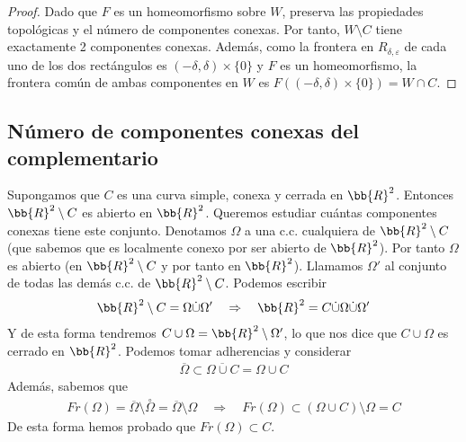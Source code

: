 \begin{lema}
\begin{proof}
        Dado que $F$ es un homeomorfismo sobre $W$, preserva las propiedades topológicas y el número de componentes conexas. Por tanto, $W \setminus C$ tiene exactamente 2 componentes conexas. Además, como la frontera en $R_{\delta,\varepsilon}$ de cada uno de los dos rectángulos es $(-\delta, \delta) \times \{0\}$ y $F$ es un homeomorfismo, la frontera común de ambas componentes en $W$ es $F((-\delta, \delta) \times \{0\}) = W\cap C$.
    \end{proof}
\end{lema}

\subsection{Número de componentes conexas del complementario}

\begin{observacion}
    Supongamos que $C$ es una curva simple, conexa y cerrada en $\bb{R}^2$. Entonces $\bb{R}^2 \setminus C$ es abierto en $\bb{R}^2$. Queremos estudiar cuántas componentes conexas tiene este conjunto. Denotamos $\Omega$ a una c.c. cualquiera de $\bb{R}^2 \setminus C$ (que sabemos que es localmente conexo por ser abierto de $\bb{R}^2$). Por tanto $\Omega$ es abierto (en $\bb{R}^2\setminus C$ y por tanto en $\bb{R}^2$). Llamamos $\Omega'$ al conjunto de todas las demás c.c. de $\bb{R}^2 \setminus C$. Podemos escribir
    \begin{gather*}
        \bb{R}^2 \setminus C = \Omega \dot{\cup} \Omega' \quad \Rightarrow \quad \bb{R}^2 = C \dot{\cup} \Omega \dot{\cup} \Omega'
    \end{gather*}
    Y de esta forma tendremos $C\cup \Omega = \bb{R}^2 \setminus \Omega'$, lo que nos dice que $C\cup \Omega$ es cerrado en $\bb{R}^2$. Podemos tomar adherencias y considerar
    \begin{gather*}
        \overline{\Omega} \subset \overline{\Omega \cup C} = \Omega \cup C 
    \end{gather*}
    Además, sabemos que 
    \begin{gather*}
        Fr(\Omega) = \overline{\Omega} \setminus \overset{\circ}{\Omega} = \overline{\Omega} \setminus \Omega \quad \Rightarrow \quad Fr(\Omega) \subset (\Omega \cup C)\setminus \Omega = C
    \end{gather*}
    De esta forma hemos probado que $Fr(\Omega) \subset C$.\\


\end{observacion}
